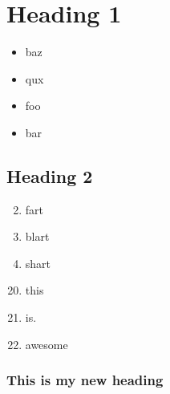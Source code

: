 \documentclass{article}
\begin{document}
\section{Heading 1}
\begin{itemize}
    \item baz
    \item qux
\end{itemize}

\begin{itemize}
    \item foo
    \item bar
\end{itemize}

\subsection{Heading 2}
\begin{enumerate}
    \setcounter{enumi}{1}
    \item  fart
    \item  blart
    \item  shart
\end{enumerate}

\begin{enumerate}
    \setcounter{enumi}{19}
    \item  this
    \item  is.
    \item  awesome
\end{enumerate}

\subsubsection{This is my new heading}
\end{document}
